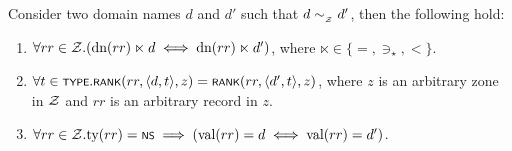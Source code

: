 \begin{lemma}\label{lem:synt-dom-cong-fundamental}
	Consider two domain names $d$ and $d'$ such that $d \simZ d'$, then the following hold:
	\begin{enumerate}
		\item $\forall rr\in\cal Z. (\text{dn}(rr) \ltimes d \iff \text{dn}(rr) \ltimes d')$, where $\ltimes \in \{=,\ni_{\star},<\}$.
		\item $\forall t\in\scrsf{type}. \scrsf{rank}(rr,\tup{d,t},z) = \scrsf{rank}(rr,\tup{d',t},z)$, where $z$ is an arbitrary zone in $\cal Z$ and $rr$ is an arbitrary record in $z$.
		\item $\forall rr\in\cal Z. \text{ty}(rr) = \scrsf{ns} \implies (\text{val}(rr) = d \iff \text{val}(rr) = d')$.
	\end{enumerate}
\end{lemma}

